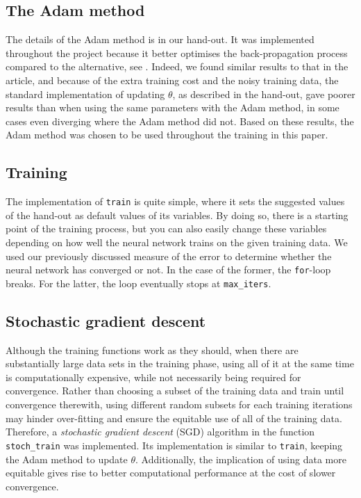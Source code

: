 \documentclass{article}
\begin{document}
\subsection{The Adam method}
The details of the Adam method is in our hand-out. It was implemented throughout the project because it better optimises the back-propagation process compared to the alternative, see \cite{Adam}. Indeed, we found similar results to that in the article, and because of the extra training cost and the noisy training data, the standard implementation of updating $\theta$, as described in the hand-out, gave poorer results than when using the same parameters with the Adam method, in some cases even diverging where the Adam method did not. Based on these results, the Adam method was chosen to be used throughout the training in this paper.

\subsection{Training}
The implementation of \verb|train| is quite simple, where it sets the suggested values of the hand-out as default values of its variables. By doing so, there is a starting point of the training process, but you can also easily change these variables depending on how well the neural network trains on the given training data. We used our previously discussed measure of the error to determine whether the neural network has converged or not. In the case of the former, the \verb|for|-loop breaks. For the latter, the loop eventually stops at \verb|max_iters|.

\subsection{Stochastic gradient descent}
Although the training functions work as they should, when there are substantially large data sets in the training phase, using all of it at the same time is computationally expensive, while not necessarily being required for convergence. Rather than choosing a subset of the training data and train until convergence therewith, using different random subsets for each training iterations may hinder over-fitting and ensure the equitable use of all of the training data. Therefore, a \textit{stochastic gradient descent} (SGD) algorithm in the function \verb|stoch_train| was implemented. Its implementation is similar to \verb|train|, keeping the Adam method to update $\theta$. Additionally, the implication of using data more equitable gives rise to better computational performance at the cost of slower convergence.
\end{document}
